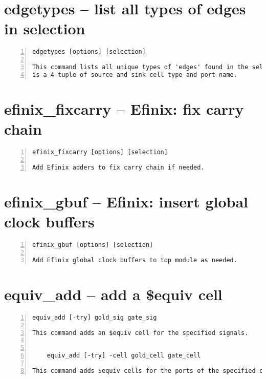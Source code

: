 \section{edgetypes -- list all types of edges in selection}
\label{cmd:edgetypes}
\begin{lstlisting}[numbers=left,frame=single]
    edgetypes [options] [selection]

This command lists all unique types of 'edges' found in the selection. An 'edge'
is a 4-tuple of source and sink cell type and port name.
\end{lstlisting}

\section{efinix\_fixcarry -- Efinix: fix carry chain}
\label{cmd:efinix_fixcarry}
\begin{lstlisting}[numbers=left,frame=single]
    efinix_fixcarry [options] [selection]

Add Efinix adders to fix carry chain if needed.
\end{lstlisting}

\section{efinix\_gbuf -- Efinix: insert global clock buffers}
\label{cmd:efinix_gbuf}
\begin{lstlisting}[numbers=left,frame=single]
    efinix_gbuf [options] [selection]

Add Efinix global clock buffers to top module as needed.
\end{lstlisting}

\section{equiv\_add -- add a \$equiv cell}
\label{cmd:equiv_add}
\begin{lstlisting}[numbers=left,frame=single]
    equiv_add [-try] gold_sig gate_sig

This command adds an $equiv cell for the specified signals.


    equiv_add [-try] -cell gold_cell gate_cell

This command adds $equiv cells for the ports of the specified cells.
\end{lstlisting}

